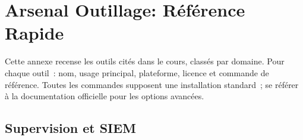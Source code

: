
\chapter{Arsenal Outillage: Référence Rapide}
\label{ann:tools}

\begin{boxinfo}
Cette annexe recense les outils cités dans le cours, classés par domaine.
Pour chaque outil~: nom, usage principal, plateforme, licence et commande
de référence. Toutes les commandes supposent une installation standard~;
se référer à la documentation officielle pour les options avancées.
\end{boxinfo}

\section{Supervision et SIEM}
\label{ann:tools-siem}

